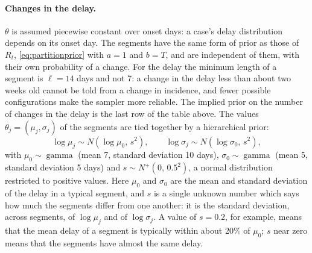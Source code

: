 \documentclass[11pt,a4paper]{article}
\begin{document}
\paragraph{Changes in the delay.} $\theta$ is assumed piecewise constant over onset
days: a case's delay distribution depends on its onset day. The segments have
the same form of prior as those of $R_t$, \eqref{eq:partitionprior} with
$a=1$ and $b=T$, and are independent of them, with their own probability of
a change. For the delay the minimum length of a segment is $\ell=14$ days
and not 7: a change in the delay less than about two weeks old cannot be
told from a change in incidence, and fewer possible configurations make the
sampler more reliable. The implied prior on the number of changes in the
delay is the last row of the table above. The values $\theta_j=(\mu_j,\sigma_j)$ of the
segments are tied together by a hierarchical prior:
\begin{equation}\label{eq:delayhierarchy}
\log\mu_j\sim N(\log\mu_0,\,s^2),\qquad \log\sigma_j\sim N(\log\sigma_0,\,s^2),
\end{equation}
with $\mu_0\sim\operatorname{gamma}$ (mean 7, standard deviation 10 days),
$\sigma_0\sim\operatorname{gamma}$ (mean 5, standard deviation 5 days) and
$s\sim N^{+}(0,\,0.5^2)$, a normal distribution restricted to positive values.
Here $\mu_0$ and $\sigma_0$ are the mean and standard deviation of the delay
in a typical segment, and $s$ is a single unknown number which says how much
the segments differ from one another: it is the standard deviation, across
segments, of $\log\mu_j$ and of $\log\sigma_j$. A value of $s=0.2$, for
example, means that the mean delay of a segment is typically within about
20\% of $\mu_0$; $s$ near zero means that the segments have almost the same
delay.
\end{document}
